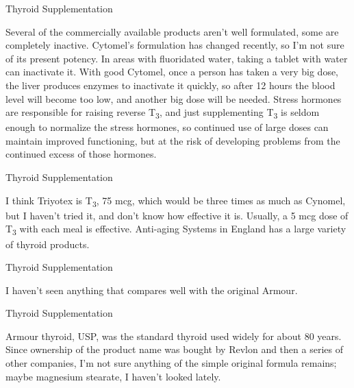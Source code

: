 \documentclass[11pt,oneside,openany,extrafontsizes]{memoir}
\begin{document}
\begin{standalonequote}{Thyroid Supplementation}

    \begin{answer}
        Several of the commercially available products aren't well formulated, some are completely inactive. Cytomel's formulation has changed recently, so I'm not sure of its present potency. In areas with fluoridated water, taking a tablet with water can inactivate it. With good Cytomel, once a person has taken a very big dose, the liver produces enzymes to inactivate it quickly, so after 12 hours the blood level will become too low, and another big dose will be needed. Stress hormones are responsible for raising reverse T\textsubscript{3}, and just supplementing T\textsubscript{3} is seldom enough to normalize the stress hormones, so continued use of large doses can maintain improved functioning, but at the risk of developing problems from the continued excess of those hormones.
    \end{answer}
\end{standalonequote}

\begin{standalonequote}{Thyroid Supplementation}

    \begin{answer}
        I think Triyotex is T\textsubscript{3}, 75 mcg, which would be three times as much as Cynomel, but I haven't tried it, and don't know how effective it is. Usually, a 5 mcg dose of T\textsubscript{3} with each meal is effective. Anti-aging Systems in England has a large variety of thyroid products.
    \end{answer}
\end{standalonequote}

\begin{standalonequote}{Thyroid Supplementation}

    \begin{answer}
        I haven't seen anything that compares well with the original Armour.
    \end{answer}
\end{standalonequote}

\begin{standalonequote}{Thyroid Supplementation}

    \begin{answer}
        Armour thyroid, USP, was the standard thyroid used widely for about 80 years. Since ownership of the product name was bought by Revlon and then a series of other companies, I'm not sure anything of the simple original formula remains; maybe magnesium stearate, I haven't looked lately.
    \end{answer}
\end{standalonequote}
\end{document}
